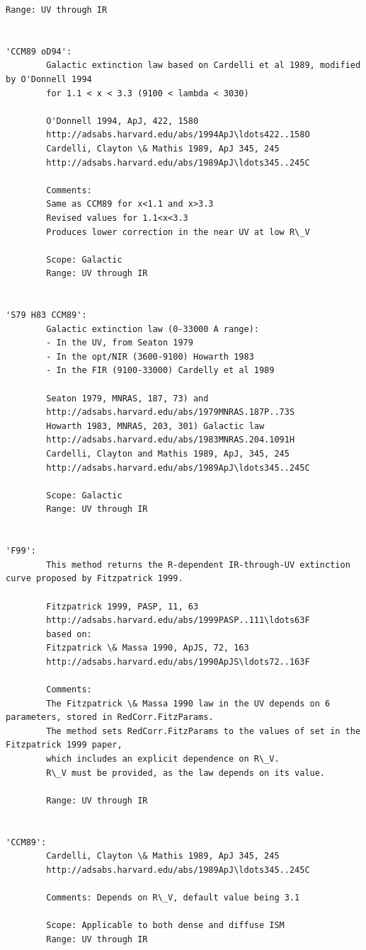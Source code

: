 \documentclass{report}
\begin{document}
\begin{Verbatim}[commandchars=\\\{\}]
        Range: UV through IR
        
        
'CCM89 oD94': 
        Galactic extinction law based on Cardelli et al 1989, modified by O'Donnell 1994
        for 1.1 < x < 3.3 (9100 < lambda < 3030)
        
        O'Donnell 1994, ApJ, 422, 1580
        http://adsabs.harvard.edu/abs/1994ApJ\ldots422..158O
        Cardelli, Clayton \& Mathis 1989, ApJ 345, 245
        http://adsabs.harvard.edu/abs/1989ApJ\ldots345..245C

        Comments:
        Same as CCM89 for x<1.1 and x>3.3
        Revised values for 1.1<x<3.3
        Produces lower correction in the near UV at low R\_V
        
        Scope: Galactic
        Range: UV through IR
        
        
'S79 H83 CCM89': 
        Galactic extinction law (0-33000 A range):
        - In the UV, from Seaton 1979
        - In the opt/NIR (3600-9100) Howarth 1983
        - In the FIR (9100-33000) Cardelly et al 1989
        
        Seaton 1979, MNRAS, 187, 73) and 
        http://adsabs.harvard.edu/abs/1979MNRAS.187P..73S
        Howarth 1983, MNRAS, 203, 301) Galactic law
        http://adsabs.harvard.edu/abs/1983MNRAS.204.1091H
        Cardelli, Clayton and Mathis 1989, ApJ, 345, 245
        http://adsabs.harvard.edu/abs/1989ApJ\ldots345..245C
        
        Scope: Galactic
        Range: UV through IR
        
        
'F99': 
        This method returns the R-dependent IR-through-UV extinction curve proposed by Fitzpatrick 1999.

        Fitzpatrick 1999, PASP, 11, 63
        http://adsabs.harvard.edu/abs/1999PASP..111\ldots63F
        based on: 
        Fitzpatrick \& Massa 1990, ApJS, 72, 163
        http://adsabs.harvard.edu/abs/1990ApJS\ldots72..163F
        
        Comments:
        The Fitzpatrick \& Massa 1990 law in the UV depends on 6 parameters, stored in RedCorr.FitzParams.
        The method sets RedCorr.FitzParams to the values of set in the Fitzpatrick 1999 paper, 
        which includes an explicit dependence on R\_V.
        R\_V must be provided, as the law depends on its value.
        
        Range: UV through IR

        
'CCM89': 
        Cardelli, Clayton \& Mathis 1989, ApJ 345, 245
        http://adsabs.harvard.edu/abs/1989ApJ\ldots345..245C

        Comments: Depends on R\_V, default value being 3.1

        Scope: Applicable to both dense and diffuse ISM
        Range: UV through IR
    \end{Verbatim}
\end{document}
